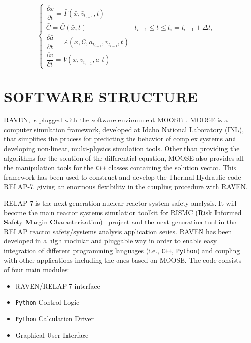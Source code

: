 \documentclass{anstrans}
\begin{document}
\begin{equation}
\begin{cases} 
\dfrac{\partial \bar{x}}{\partial t} = \bar{F}(\bar{x},\bar{v}_{t_{i-1}},t) \\
\bar{C} = \bar{G}(\bar{x},t) & t_{i-1}\leq t\leq t_{i} = t_{i-1} + \Delta t_{i}\\ 
\dfrac{\partial \bar{a}}{\partial t} = \bar{A}(\bar{x},\bar{C},\bar{a}_{t_{i-1}},\bar{v}_{t_{i-1}},t) \\
\dfrac{\partial \bar{v}}{\partial t} = \bar{V}(\bar{x},\bar{v}_{t_{i-1}},\bar{a},t) 
\end{cases}
\label{eq:generalSystemEquationwithControlSplittingAndAux}
\end{equation}


\section{SOFTWARE STRUCTURE}
RAVEN, is plugged with the software environment MOOSE~\cite{MOOSE}. MOOSE is a computer simulation framework,  developed at Idaho National Laboratory (INL), that simplifies the process for predicting the behavior of complex systems and developing non-linear, multi-physics simulation tools. Other than providing the algorithms for the solution of the differential equation, MOOSE also provides all the manipulation tools for the \verb!C++! classes containing the solution vector. This framework has been used to construct and develop the Thermal-Hydraulic code RELAP-7, giving an enormous flexibility in the coupling procedure with RAVEN. 

RELAP-7 is the next generation nuclear reactor system safety analysis. It will become the main reactor systems simulation toolkit for RISMC (\textbf{R}isk \textbf{I}nformed \textbf{S}afety \textbf{M}argin \textbf{C}haracterization)~\cite{mandelliANS_RISMC} project and the next generation tool in the RELAP reactor safety/systems analysis application series. 
RAVEN has been developed in a high modular and pluggable way in order to enable easy integration of different programming languages (i.e., \verb!C++!, \verb!Python!) and coupling with other applications including the ones based on MOOSE. The code consists of four main modules:
\begin{itemize}
\item RAVEN/RELAP-7 interface
\item \verb!Python! Control Logic 
\item \verb!Python! Calculation Driver
\item Graphical User Interface 
\end{itemize}
\end{document}
